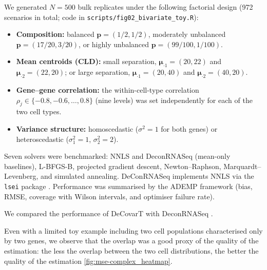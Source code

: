 \documentclass[pdflatex, sn-nature]{sn-jnl}
\theoremstyle{thmstyleone}%
\theoremstyle{thmstyletwo}%
\theoremstyle{thmstylethree}%
\begin{document}
    We generated $N=500$ bulk replicates under the following factorial
    design (972 scenarios in total; code in
    \texttt{scripts/fig02\_bivariate\_toy.R}):

    \begin{itemize}
        \item \textbf{Composition:} balanced $\boldsymbol{p}=(1/2,1/2)$,
            moderately unbalanced $\boldsymbol{p}=(17/20,3/20)$,
            or highly unbalanced $\boldsymbol{p}=(99/100,1/100)$.

        \item \textbf{Mean centroids (CLD):} small separation,
            $\boldsymbol{\mu}_{\cdot 1}=(20,22)$ and
            $\boldsymbol{\mu}_{\cdot 2}=(22,20)$; or large separation,
            $\boldsymbol{\mu}_{\cdot 1}=(20,40)$ and
            $\boldsymbol{\mu}_{\cdot 2}=(40,20)$.

        \item \textbf{Gene--gene correlation:} the within-cell-type
            correlation $\rho_{j}\in\{-0.8,-0.6,\ldots,0.8\}$ (nine
            levels) was set independently for each of the two cell types.

        \item \textbf{Variance structure:} homoscedastic
            ($\sigma^{2}=1$ for both genes) or heteroscedastic
            ($\sigma_{1}^{2}=1$, $\sigma_{2}^{2}=2$).
    \end{itemize}

    Seven solvers were benchmarked: NNLS and DeconRNASeq
    (mean-only baselines), L-BFGS-B, projected gradient descent,
    Newton--Raphson, Marquardt--Levenberg, and simulated annealing.
    DeConRNASeq implements NNLS via the \texttt{lsei} package
    \cite{gongDeconRNASeqStatisticalFramework2013}.
    Performance was summarised by the ADEMP framework
    \cite{morrisUsingSimulationStudies2019} (bias, RMSE, coverage with
    Wilson intervals, and optimiser failure rate).

    We compared the performance of DeCovarT with DeconRNASeq
    \cite{gongDeconRNASeqStatisticalFramework2013}.

    Even with a limited toy example including two cell populations characterised
    only by two genes, we observe that the overlap was a good proxy of the quality
    of the estimation: the less the overlap between the two cell distributions, the
    better the quality of the estimation \ref{fig:mse-complex_heatmap}. 
\end{document}
